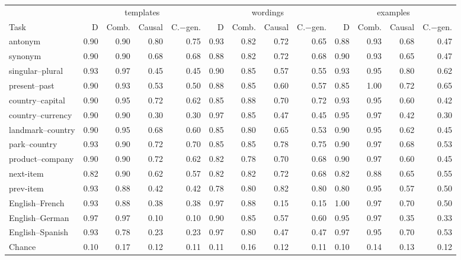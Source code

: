 \begin{tabular}{@{}lrrrrrrrrrrrr@{}}
\toprule
 & \multicolumn{4}{c}{templates} & \multicolumn{4}{c}{wordings} & \multicolumn{4}{c}{examples} \\
\cmidrule(lr){2-5} \cmidrule(lr){6-9} \cmidrule(lr){10-13}
Task & D & Comb. & Causal & C.$-$gen. & D & Comb. & Causal & C.$-$gen. & D & Comb. & Causal & C.$-$gen. \\
\midrule
antonym & 0.90 & 0.90 & 0.80 & 0.75 & 0.93 & 0.82 & 0.72 & 0.65 & 0.88 & 0.93 & 0.68 & 0.47 \\
synonym & 0.90 & 0.90 & 0.68 & 0.68 & 0.88 & 0.82 & 0.72 & 0.68 & 0.90 & 0.93 & 0.65 & 0.47 \\
singular--plural & 0.93 & 0.97 & 0.45 & 0.45 & 0.90 & 0.85 & 0.57 & 0.55 & 0.93 & 0.95 & 0.80 & 0.62 \\
present--past & 0.90 & 0.93 & 0.53 & 0.50 & 0.88 & 0.85 & 0.60 & 0.57 & 0.85 & 1.00 & 0.72 & 0.65 \\
country--capital & 0.90 & 0.95 & 0.72 & 0.62 & 0.85 & 0.88 & 0.70 & 0.72 & 0.93 & 0.95 & 0.60 & 0.42 \\
country--currency & 0.90 & 0.90 & 0.30 & 0.30 & 0.97 & 0.85 & 0.47 & 0.45 & 0.95 & 0.97 & 0.42 & 0.30 \\
landmark--country & 0.90 & 0.95 & 0.68 & 0.60 & 0.85 & 0.80 & 0.65 & 0.53 & 0.90 & 0.95 & 0.62 & 0.45 \\
park--country & 0.93 & 0.90 & 0.72 & 0.70 & 0.85 & 0.85 & 0.78 & 0.75 & 0.90 & 0.97 & 0.68 & 0.53 \\
product--company & 0.90 & 0.90 & 0.72 & 0.62 & 0.82 & 0.78 & 0.70 & 0.68 & 0.90 & 0.97 & 0.60 & 0.45 \\
next-item & 0.82 & 0.90 & 0.62 & 0.57 & 0.82 & 0.82 & 0.72 & 0.68 & 0.82 & 0.88 & 0.65 & 0.55 \\
prev-item & 0.93 & 0.88 & 0.42 & 0.42 & 0.78 & 0.80 & 0.82 & 0.80 & 0.80 & 0.95 & 0.57 & 0.50 \\
English--French & 0.93 & 0.88 & 0.38 & 0.38 & 0.97 & 0.88 & 0.15 & 0.15 & 1.00 & 0.97 & 0.70 & 0.50 \\
English--German & 0.97 & 0.97 & 0.10 & 0.10 & 0.90 & 0.85 & 0.57 & 0.60 & 0.95 & 0.97 & 0.35 & 0.33 \\
English--Spanish & 0.93 & 0.78 & 0.23 & 0.23 & 0.97 & 0.80 & 0.47 & 0.47 & 0.97 & 0.95 & 0.70 & 0.53 \\
\midrule
Chance & 0.10 & 0.17 & 0.12 & 0.11 & 0.11 & 0.16 & 0.12 & 0.11 & 0.10 & 0.14 & 0.13 & 0.12 \\
\bottomrule
\end{tabular}
